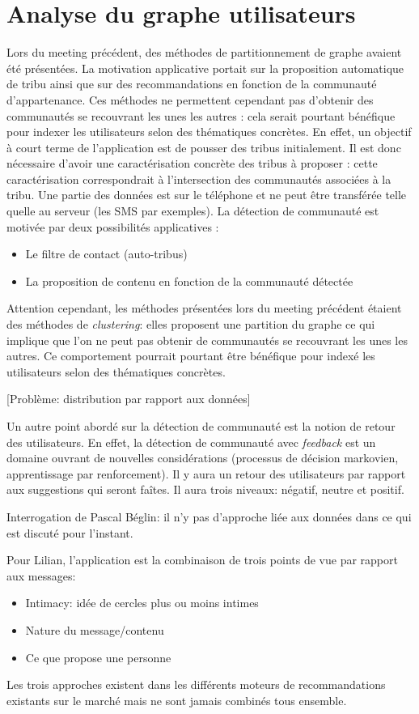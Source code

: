 \documentclass[a4paper]{article}
\begin{document}
\section*{Analyse du graphe utilisateurs}
\label{sec:community_detection}
Lors du meeting précédent, des méthodes de partitionnement de graphe avaient été
présentées. La motivation applicative portait sur la proposition automatique
de tribu ainsi que sur des recommandations en fonction de la communauté
d'appartenance. Ces méthodes ne permettent cependant pas d'obtenir des communautés
se recouvrant les unes les autres : cela serait pourtant bénéfique pour indexer
les utilisateurs selon des thématiques concrètes. En effet, un objectif à court
terme de l'application est de pousser des tribus initialement. Il est donc
nécessaire d'avoir une caractérisation concrète des tribus à proposer : cette
caractérisation correspondrait à l'intersection des communautés associées à la
tribu.
Une partie des données est sur le téléphone et ne peut être transférée telle
quelle au serveur (les SMS par exemples).
La détection de communauté est motivée par deux possibilités applicatives :
\begin{itemize}
    \item Le filtre de contact (auto-tribus)
    \item La proposition de contenu en fonction de la communauté détectée
\end{itemize}
Attention cependant, les méthodes présentées lors du meeting précédent étaient
des méthodes de \emph{clustering}: elles proposent une partition du graphe ce
qui implique que l'on ne peut pas obtenir de communautés se recouvrant les unes
les autres. Ce comportement pourrait pourtant être bénéfique pour indexé les
utilisateurs selon des thématiques concrètes.

[Problème: distribution par rapport aux données]

Un autre point abordé sur la détection de communauté est la notion de retour
des utilisateurs. En effet, la détection de communauté avec \emph{feedback} est
un domaine ouvrant de nouvelles considérations (processus de décision
markovien, apprentissage par renforcement). Il y aura un retour des
utilisateurs par rapport aux suggestions qui seront faîtes. Il aura trois
niveaux: négatif, neutre et positif.

Interrogation de Pascal Béglin: il n'y pas d'approche liée aux données dans ce
qui est discuté pour l'instant.

Pour Lilian, l'application est la combinaison de trois points de vue par
rapport aux messages:
\begin{itemize}
    \item Intimacy: idée de cercles plus ou moins intimes
    \item Nature du message/contenu
    \item Ce que propose une personne
\end{itemize}
Les trois approches existent dans les différents moteurs de recommandations
existants sur le marché mais ne sont jamais combinés tous ensemble.
\end{document}
